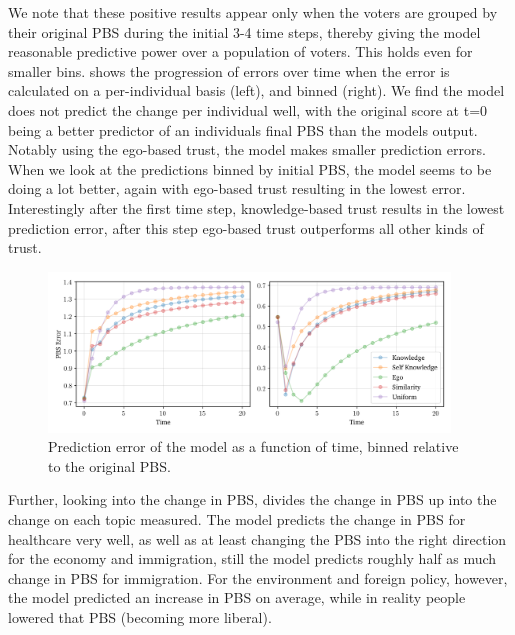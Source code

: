 We note that these positive results appear only when the voters are grouped by
their original PBS during the initial 3-4 time steps, thereby giving the model
reasonable predictive power over a population of voters.  This holds even for
smaller bins.  shows the progression of errors over
time when the error is calculated on a per-individual basis (left), and binned
(right). We find the model does not predict the change per individual well,
with the original score at t=0 being a better predictor of an individuals final
PBS than the models output. Notably using the ego-based trust, the model makes
smaller prediction errors. When we look at the predictions binned by initial
PBS, the model seems to be doing a lot better, again with ego-based trust
resulting in the lowest error. Interestingly after the first time step,
knowledge-based trust results in the lowest prediction error, after this step
ego-based trust outperforms all other kinds of trust.


\begin{figure}[ht]
	\begin{center}
		\includegraphics[width=0.95\textwidth]{Figures/errors_binned.png}
	\end{center}
	\caption{Prediction error of the model as a function of time, binned relative to the original  PBS.}\label{fig:binned_errors}
\end{figure}


Further, looking into the change in PBS,  divides the
change in PBS up into the change on each topic measured. The model predicts the
change in PBS for healthcare very well, as well as at least changing the PBS
into the right direction for the economy and immigration, still the model
predicts roughly half as much change in PBS for immigration. For the
environment and foreign policy, however, the model predicted an increase in PBS
on average, while in reality people lowered that PBS (becoming more liberal).

